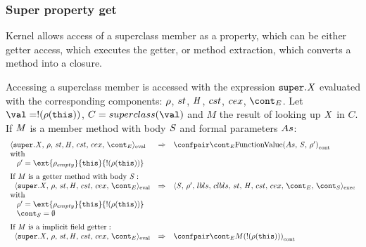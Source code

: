 \documentclass{article}
\begin{document}
\subsubsection{Super property get}
\label{subsubsec:super-property-get}
Kernel allows access of a superclass member as a property, which can be either getter access, which executes the getter, or method extraction, which converts a method into a closure.
\newcommand{\this}{\tt{this}}
\newcommand{\superclass}[1]{superclass({#1})}

\noindent
Accessing a superclass member is accessed with the expression $\tt{super}.\mathit{X}$ evaluated with the corresponding components: $\rho$, $st$, $\mathit{H}$, $cst$, $cex$, $\econt$. Let $\val = \deref{(\env(\this))}$, $C = \superclass{\val}$ and $M$ the result of looking up $\mathit{X}$ in $C$.\\

\noindent
If $\mathit{M}$ is a member method with body $\mathit{S}$ and formal parameters $As$:
\[
  \begin{array}{lcl}
	\cesktrans{
		\evalconf{\SuperPropertyGet{\idmeta}}{\env}{\strace}{\cstrace}{\cex}{\econt}}{
		\contconf{\econt}{\funval{\formals}{\stmt}{\env'}}}\\
	\textrm{with }\\
	\hspace{3mm}
	\env' = \ext{\env_{empty}}{\this}{\deref{(\env(\this))}}\\[2mm]

	\textrm{If }\membermeta \textrm{ is a getter method with body }\stmt :\\
	\hspace{2mm}
	\cesktrans{
		\evalconf{\SuperPropertyGet{\idmeta}}{\env}{\strace}{\cstrace}{\cex}{\econt}}{
		\execconf{\stmt}{\env'}{\lbls}{\clbls}{\handler}{\cstrace}{\cex}{\econt}{\scont}}\\
	\textrm{with}\\
	\hspace{3mm}
	\env' =  \ext{\env_{empty}}{\this}{\deref{(\env(\this))}}\\
	\hspace{3mm}
	\scont = \emptyset\\[2mm]

	\textrm{If }\membermeta \textrm{ is a implicit field getter} :\\
	\hspace{2mm}
	\cesktrans{
		\evalconf{\SuperPropertyGet{\idmeta}}{\env}{\strace}{\cstrace}{\cex}{\econt}}{
		\contconf{\econt}{M(\deref{(\env(\this))})}}\\
  \end{array}
\]
\end{document}

